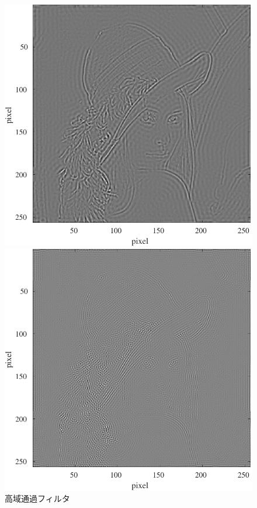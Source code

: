 \begin{figure}[H]
\begin{minipage}[b]{.15\textwidth}
    \end{minipage}
    \begin{minipage}[b]{.15\textwidth}
        \centering
        \includegraphics[keepaspectratio,width=\textwidth]{../../Figures/08_44_fft-filter-50.pdf}
    \end{minipage}
    \begin{minipage}[b]{.15\textwidth}
        \centering
        \includegraphics[keepaspectratio,width=\textwidth]{../../Figures/08_45_fft-filter-100.pdf}
    \end{minipage}
    \caption{高域通過フィルタ}
\end{figure}
